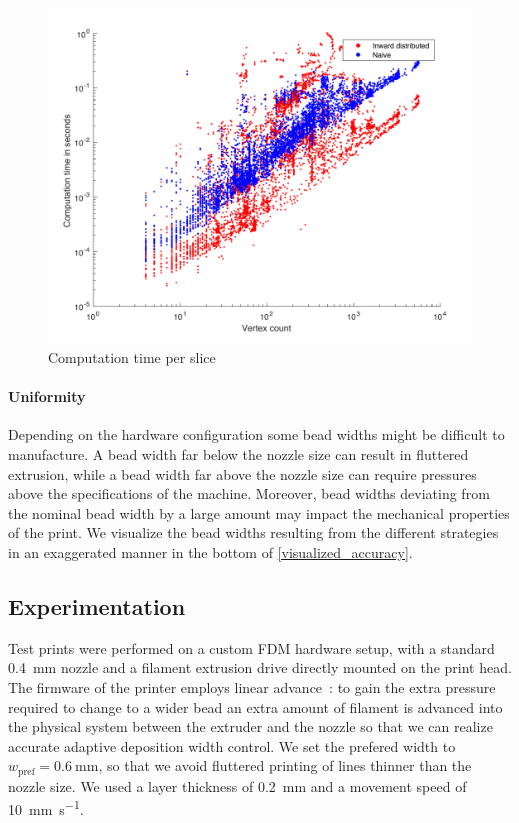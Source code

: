 \begin{figure}
\includegraphics[width=\columnwidth]{sources/validation/computime.pdf}
\caption{Computation time per slice}
\label{computime}
\end{figure}




\paragraph{Uniformity}
Depending on the hardware configuration some bead widths might be difficult to manufacture.
A bead width far below the nozzle size can result in fluttered extrusion, while a bead width far above the nozzle size can require pressures above the specifications of the machine.
Moreover, bead widths deviating from the nominal bead width by a large amount may impact the mechanical properties of the print.
We visualize the bead widths resulting from the different strategies in an exaggerated manner in the bottom of \cref{visualized_accuracy}.





\subsection{Experimentation}
Test prints were performed on a custom FDM hardware setup, with a standard \SI{0.4}{\milli\meter} nozzle and a filament extrusion drive directly mounted on the print head.
The firmware of the printer employs linear advance~\cite{linadvance}: to gain the extra pressure required to change to a wider bead an extra amount of filament is advanced into the physical system between the extruder and the nozzle so that we can realize accurate adaptive deposition width control.
We set the prefered width to $w_\text{pref} = \SI{0.6}{\milli\meter}$, so that we avoid fluttered printing of lines thinner than the nozzle size.
We used a layer thickness of \SI{0.2}{\milli\meter} and a movement speed of \SI{10}{\milli\meter\per\second}.

